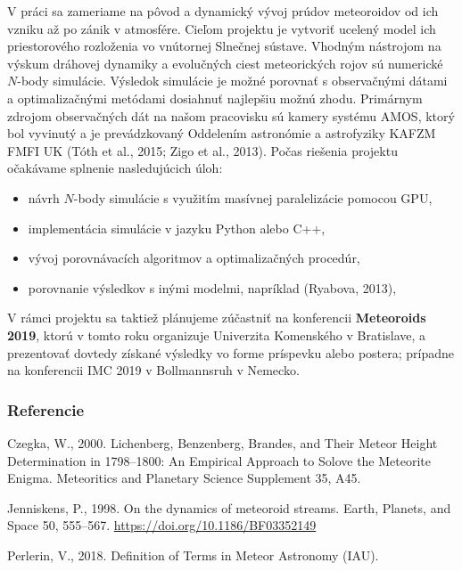 V práci sa zameriame na pôvod a dynamický vývoj prúdov meteoroidov od
ich vzniku až po zánik v atmosfére. Cieľom projektu je vytvoriť ucelený
model ich priestorového rozloženia vo vnútornej Slnečnej sústave.
Vhodným nástrojom na výskum dráhovej dynamiky a evolučných ciest
meteorických rojov sú numerické \(N\)-body simulácie. Výsledok simulácie
je možné porovnať s observačnými dátami a optimalizačnými metódami
dosiahnuť najlepšiu možnú zhodu. Primárnym zdrojom observačných dát na
našom pracovisku sú kamery systému AMOS, ktorý bol vyvinutý a je
prevádzkovaný Oddelením astronómie a astrofyziky KAFZM FMFI UK (Tóth et
al., 2015; Zigo et al., 2013). Počas riešenia projektu očakávame
splnenie nasledujúcich úloh:

\begin{itemize}
\tightlist
\item
  návrh \(N\)-body simulácie s využitím masívnej paralelizácie pomocou
  GPU,
\item
  implementácia simulácie v jazyku Python alebo C++,
\item
  vývoj porovnávacích algoritmov a optimalizačných procedúr,
\item
  porovnanie výsledkov s inými modelmi, napríklad (Ryabova, 2013),
\end{itemize}

V rámci projektu sa taktiež plánujeme zúčastniť na konferencii
\textbf{Meteoroids 2019}, ktorú v tomto roku organizuje Univerzita
Komenského v Bratislave, a prezentovať dovtedy získané výsledky vo forme
príspevku alebo postera; prípadne na konferencii IMC 2019 v Bollmannsruh
v Nemecko.

\subsubsection*{Referencie}\label{referencie}

\hypertarget{refs}{}
\hypertarget{ref-czegka2000}{}
Czegka, W., 2000. Lichenberg, Benzenberg, Brandes, and Their Meteor
Height Determination in 1798--1800: An Empirical Approach to Solove the
Meteorite Enigma. Meteoritics and Planetary Science Supplement 35, A45.

\hypertarget{ref-jenniskens1998}{}
Jenniskens, P., 1998. On the dynamics of meteoroid streams. Earth,
Planets, and Space 50, 555--567.
\url{https://doi.org/10.1186/BF03352149}

\hypertarget{ref-imo-meteor}{}
Perlerin, V., 2018. Definition of Terms in Meteor Astronomy (IAU).

